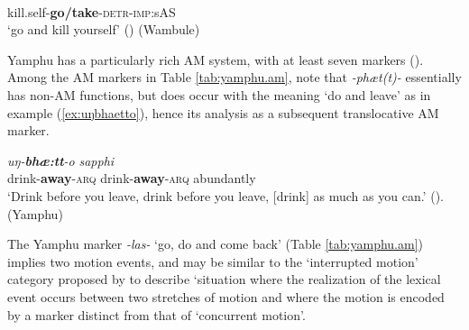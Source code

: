 \documentclass[oneside,a4paper,11pt]{article}
\newcommand{\ipa}[1]{{\phon\textit{#1}}}
\newcommand{\sens}[1]{‘#1’}
\newcommand{\rouge}[1]{\textbf{#1}}
\begin{document}
\begin{exe}
\ex \label{ex:seilwasta}
\gll \ipa{sei-\rouge{lwa}-s-ta} \\
kill.self-\rouge{go/take}-\textsc{detr}-\textsc{imp}:sAS   \\
\glt \sens{go and kill yourself} (\citealt[439]{opgenort04wambule})  (Wambule)
\end{exe}

Yamphu has a particularly rich AM system, with at least seven markers (\citealt[137-194]{rutgers98yamphu}). Among the AM markers in Table \ref{tab:yamphu.am}, note that \ipa{-phæt(t)-} essentially has non-AM functions, but does occur with the meaning `do and leave' as in example (\ref{ex:uŋbhaetto}), hence its analysis as a subsequent translocative AM marker.  
 
 \begin{exe}
\ex \label{ex:uŋbhaetto}
\gll \ipa{uŋ-\rouge{bhæ:tt}-o}	\ipa{uŋ-\rouge{bhæ:tt}-o}	\ipa{sapphi} \\
drink-\rouge{away}-\textsc{arq} drink-\rouge{away}-\textsc{arq}  abundantly\\
\glt \sens{Drink before you leave, drink before you leave, [drink] as much as you can.} (\citealt[150]{rutgers98yamphu}). (Yamphu)
\end{exe}

The Yamphu marker \ipa{-las-} `go, do and come back' (Table \ref{tab:yamphu.am}) implies two motion events, and may be similar to the `interrupted motion' category proposed by \citet[123]{rose15am} to describe `situation where the realization of the lexical event occurs between two stretches of motion and where the motion is encoded by a marker distinct from that of `concurrent motion'.
\end{document}
